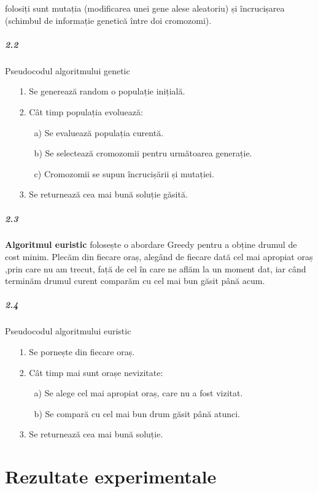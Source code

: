 \documentclass[paper=a4, fontsize=11pt]{scrartcl}
\begin{document}
\underline{} folosiți sunt mutația (modificarea unei gene alese aleatoriu) 
și încrucișarea (schimbul de informație genetică între doi cromozomi).

\subparagraph{2.2}
Pseudocodul algoritmului genetic

\begin{enumerate}
    \itemsep0em
    \item[1.] Se generează random o populație inițială.
    \item[2.] Cât timp populația evoluează:
    \begin{enumerate}
        \item[a)] Se evaluează populația curentă.
        \item[b)] Se selectează cromozomii pentru următoarea generație.
        \item[c)] Cromozomii se supun încrucișării și mutației.
    \end{enumerate} 
    \item[3.] Se returnează cea mai bună soluție găsită.
\end{enumerate}

\subparagraph{2.3}
\textbf{Algoritmul euristic} folosește o abordare Greedy pentru a obține drumul de cost minim. 
Plecăm din fiecare oraș, alegând de fiecare dată cel mai apropiat oraș ,prin care nu am trecut, față de cel în care ne aflăm la un moment dat, 
iar când terminăm drumul curent comparăm cu cel mai bun găsit până acum. 

\subparagraph{2.4}
Pseudocodul algoritmului euristic
\begin{enumerate}
    \itemsep0em
    \item[1.] Se pornește din fiecare oraș.
    \item[2.] Cât timp mai sunt orașe nevizitate:
    \begin{enumerate}
        \item[a)] Se alege cel mai apropiat oraș, care nu a fost vizitat.
        \item[b)] Se compară cu cel mai bun drum găsit până atunci.
    \end{enumerate} 
    \item[3.] Se returnează cea mai bună soluție.
\end{enumerate}

\section{Rezultate experimentale}
\end{document}
